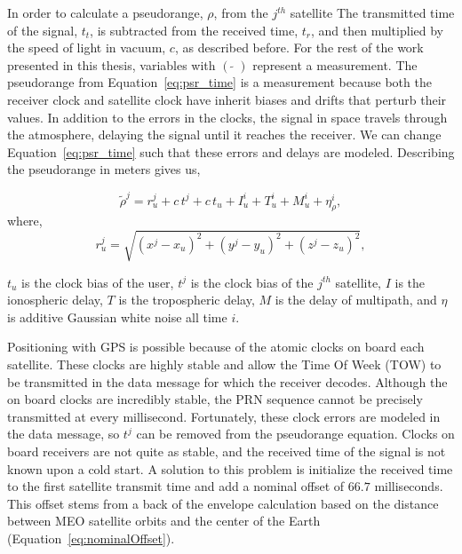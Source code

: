 In order to calculate a pseudorange, \(\rho \), from the \(j^{th}\) satellite The transmitted time of the signal, \(t_t\), is subtracted from the received time, \(t_r\), and then multiplied by the speed of light in vacuum, \(c\), as described before. For the rest of the work presented in this thesis, variables with \({\left(\;\tilde{}\;\right)}\) represent a measurement. The pseudorange from Equation~\ref{eq:psr_time} is a measurement because both the receiver clock and satellite clock have inherit biases and drifts that perturb their values. In addition to the errors in the clocks, the signal in space travels through the atmosphere, delaying the signal until it reaches the receiver. We can change Equation~\ref{eq:psr_time} such that these errors and delays are modeled. Describing the pseudorange in meters gives us,

\begin{equation}\label{eq:psr_meters}
    \tilde{\rho}^j = r_u^j + c\,t^j + c\,t_u + I^i_u + T^i_u+ M^i_u + \eta^i_{\rho},
\end{equation}
where,
\begin{equation}\label{eq:range_meters}
    r^j_u = \sqrt{{\left(x^j - x_u\right)}^2 + {\left(y^j - y_u\right)}^2 + {\left(z^j - z_u\right)}^2},
\end{equation}

\(t_u\) is the clock bias of the user, \(t^j\) is the clock bias of the \(j^{th}\) satellite, \(I\) is the ionospheric delay, \(T\) is the tropospheric delay, \(M\) is the delay of multipath, and \(\eta \) is additive Gaussian white noise all time \(i\).

Positioning with GPS is possible because of the atomic clocks on board each satellite. These clocks are highly stable and allow the Time Of Week (TOW) to be transmitted in the data message for which the receiver decodes. Although the on board clocks are incredibly stable, the PRN sequence cannot be precisely transmitted at every millisecond. Fortunately, these clock errors are modeled in the data message, so \(t^j\) can be removed from the pseudorange equation. Clocks on board receivers are not quite as stable, and the received time of the signal is not known upon a cold start. A solution to this problem is initialize the received time to the first satellite transmit time and add a nominal offset of \(66.7\) milliseconds. This offset stems from a back of the envelope calculation based on the distance between MEO satellite orbits and the center of the Earth (Equation~\ref{eq:nominalOffset}).

